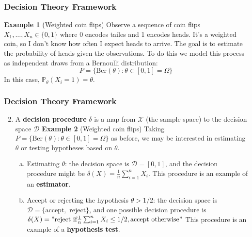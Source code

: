 \documentclass[10pt]{beamer}
\begin{document}
\begin{frame}
\frametitle{Decision Theory Framework}
\textbf{Example 1} (Weighted coin flips) \newline
\newline
Observe a sequence of coin flips $X_1,\dots,X_n \in \{0,1\}$ where 0 encodes tailes and 1 encodes heads. 
\newline
\newline
It's a weighted coin, so I don't know how often I expect heads to arrive. The goal is to estimate the probability of heads given the observations. 
\newline
\newline
To do this we model this process as independent draws from a Bernoulli distribution: $$P = \{\text{Ber}(\theta) : \theta \in [0,1] = \Omega \}$$
\newline
In this case, $\mathbb{P}_{\theta} (X_i = 1) = \theta$.

\end{frame}

\begin{frame}
\frametitle{Decision Theory Framework}
\begin{enumerate}
\setcounter{enumi}{1}
\item{A \textbf{decision procedure} $\delta$ is a map from $\mathcal{X}$ (the sample space) to the decision space $\mathcal{D}$\newline
\newline
\textbf{Example 2} (Weighted coin flips)
\newline
\newline
Taking $P = \{\text{Ber}(\theta) : \theta \in [0,1] = \Omega \}$ as before, we may be interested in estimating $\theta$ or testing hypotheses based on $\theta$.
\newline
\begin{enumerate}[(a)]
\item{Estimating $\theta$: the decision space is $\mathcal{D} = [0,1]$, and the decision procedure might be $\delta(X) = \frac{1}{n} \sum^n_{i=1} X_i$. This procedure is an example of an \textbf{estimator}.}
\newline
\item{Accept or rejecting the hypothesis $\theta > 1/2$: the decision space is $\mathcal{D} = \{\text{accept}, \text{ reject}\}$, and one possible decision procedure is $\delta(X) = "\text{reject if} \frac{1}{n} \sum^n_{i=1} X_i \leq 1/2, \text{accept otherwise}"$ This procedure is an example of a \textbf{hypothesis test}.}
\end{enumerate}
}
\end{enumerate}
\end{frame}
\end{document}
